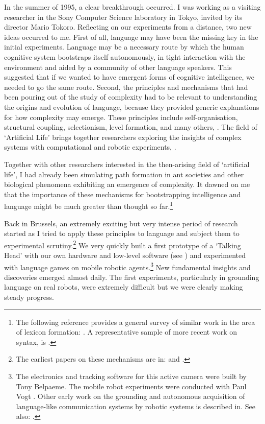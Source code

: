 In the summer of 1995, a clear breakthrough occurred.  
I was working as a visiting researcher in the Sony
Computer Science laboratory in Tokyo, invited by its director
Mario Tokoro. Reflecting on our 
experiments from a distance, two new ideas occurred to me. 
First of all, language may have been the missing key
in the initial experiments. Language may 
be a necessary route by which the human cognitive system
bootstraps itself autonomously, in tight interaction with the
environment and aided by a community of other
language speakers. This suggested that if we wanted
to have emergent
forms of cognitive intelligence, we needed to go the same 
route. Second, the principles and mechanisms that had been
pouring out of the study of complexity had to be
relevant to understanding the origins and evolution of language,
because they provided generic explanations for how complexity 
may emerge. These principles include 
self-organisation, structural coupling, 
selectionism, level formation, 
and many others, \cite{Nicolis:1989}. The field of `Artificial Life' brings together researchers
exploring the insights of complex systems with computational
and robotic experiments, \cite{Langton:1995}.

Together with 
other researchers interested in the then-arising field of `artificial life', I had 
already been simulating path formation in 
ant societies and other biological phenomena exhibiting 
an emergence of complexity. It dawned on me that the
importance of these mechanisms for bootstrapping intelligence and
language might be much greater than 
thought so far.\footnote{The following reference provides a general survey of similar work in 
the area of lexicon formation: \cite{Steels:97b}. 
A representative sample of more recent work on syntax, is \cite{Briscoe:1999}.}

Back in Brussels, an extremely exciting but very 
intense period of research started as I tried to 
apply these principles to language
and subject them to experimental 
scrutiny.\footnote{The earliest papers on these mechanisms are in: \cite{Steels:95b} and 
\cite{Steels:96a}.}
We very quickly built a first 
prototype of a `Talking Head' with our own hardware
and low-level software (see ) 
and experimented with language games on mobile 
robotic agents.\footnote{The electronics and tracking software for this 
active camera were built by Tony Belpaeme. The mobile
robot experiments were conducted with Paul Vogt \cite{Steels:97g}. 
Other early work on the grounding and autonomous acquisition of 
language-like communication systems by robotic systems is 
described in. See also: \cite{Billard:1998}.}
New fundamental insights and discoveries emerged almost daily. 
The first experiments, particularly in grounding
language on real robots, were extremely difficult but we 
were clearly making steady progress. 


